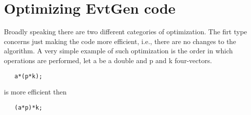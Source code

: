 \section{Optimizing EvtGen code}
\label{sect:optimization}

Broadly speaking there are two different categories of
optimization. The firt type concerns just making the code
more efficient, i.e., there are no changes to the algorithm.
A very simple example of such optimization is the order in 
which operations are performed, let a be a double and p and k 
four-vectors.
\begin{verbatim}
   a*(p*k);
\end{verbatim}
is more efficient then 
\begin{verbatim}
   (a*p)*k;
\end{verbatim}
